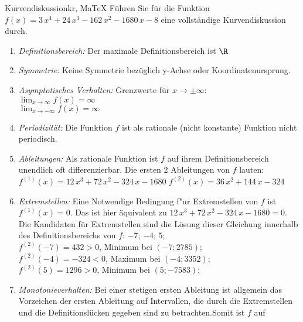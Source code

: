 \providecommand{\MoIl}{(} 
 \providecommand{\MoIr}{)}
 \providecommand{\MIntvlSep}{;} 
 \providecommand{\MElSetSep}{;} 
 \begin{MAufgabe}{Kurvendiskussion}{kr, MaTeX}
 F\"uhren Sie f\"ur die Funktion $f(x)=3\, x^4 + 24\, x^3 - 162\, x^2 - 1680\, x - 8$ eine vollst\"andige Kurvendiskussion durch.\\ 
 \ifLsg\Loesung
 \begin{enumerate}
 \item \emph{Definitionsbereich:} 
 Der maximale Definitionsbereich ist $\R$\item \emph{Symmetrie:} 
 Keine Symmetrie bez\"uglich y-Achse oder Koordinatenursprung.\item \emph{Asymptotisches Verhalten:} 
 Grenzwerte f\"ur $x\rightarrow \pm \infty$: \\ 
 $\lim_{x\rightarrow \infty} f(x)=\infty$ \\ 
 $\lim_{x\rightarrow -\infty} f(x)=\infty$ \\ 
 \item \emph{Periodizit\"at:} 
 Die Funktion $f$ ist als rationale (nicht konstante) Funktion nicht periodisch.\item \emph{Ableitungen:} 
 Als rationale Funktion ist $f$ auf ihrem Definitionsbereich unendlich oft differenzierbar. 
 Die ersten 2 Ableitungen von $f$ lauten: \\ 
 $f^{(1)}(x)=12\, x^3 + 72\, x^2 - 324\, x - 1680$\newline 
  $f^{(2)}(x)=36\, x^2 + 144\, x - 324$\newline 
  \item \emph{Extremstellen:} 
 Eine Notwendige Bedingung f"ur Extremstellen von $f$ ist $f^{(1)}(x)=0$. 
 Das ist hier \"aquivalent zu $12\, x^3 + 72\, x^2 - 324\, x - 1680=0$. 
 Die Kandidaten f\"ur Extremstellen sind die L\"osung dieser Gleichung innerhalb des Definitionsbereichs von $f$: $-7$; $-4$; $5$; \\ 
 $f^{(2)}(-7)=432$$>0$, Minimum bei $(-7;2785)$; \\ 
 $f^{(2)}(-4)=-324$$<0$, Maximum bei $(-4;3352)$; \\ 
 $f^{(2)}(5)=1296$$>0$, Minimum bei $(5;-7583)$; \\ 
 \item \emph{Monotonieverhalten:} 
 Bei einer stetigen ersten Ableitung ist allgemein das Vorzeichen der ersten Ableitung auf Intervallen, die durch die Extremstellen und die Definitionsl\"ucken gegeben sind zu betrachten.Somit ist $f$ auf \\ 
$$
\end{enumerate}
\end{MAufgabe}
